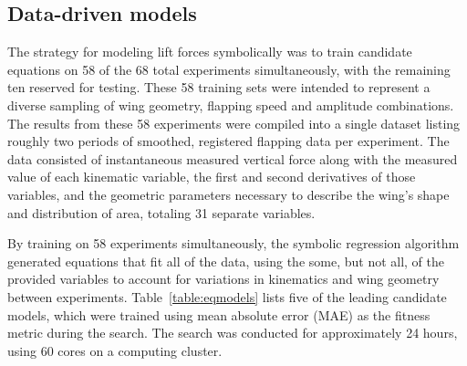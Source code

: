 \documentclass[fleqn,10pt]{wlscirep}
\begin{document}
\subsection{Data-driven models}
The strategy for modeling lift forces symbolically was to train candidate equations on 58 of the 68 total experiments simultaneously, with the remaining ten reserved for testing.  These 58 training sets were intended to represent a diverse sampling of wing geometry, flapping speed and amplitude combinations.  The results from these 58 experiments were compiled into a single dataset listing roughly two periods of smoothed, registered flapping data per experiment.  The data consisted of instantaneous measured vertical force along with the measured value of each kinematic variable, the first and second derivatives of those variables, and the geometric parameters necessary to describe the wing's shape and distribution of area, totaling 31 separate variables.

By training on 58 experiments simultaneously, the symbolic regression algorithm generated equations that fit all of the data, using the some, but not all, of the provided variables to account for variations in kinematics and wing geometry between experiments.   Table~\ref{table:eqmodels} lists five of the leading candidate models, which were trained using mean absolute error (MAE) as the fitness metric during the search. The search was conducted for approximately 24 hours, using 60 cores on a computing cluster.
\end{document}
